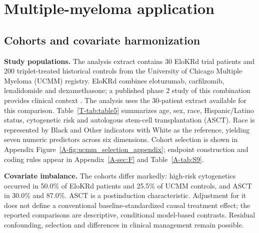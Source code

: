 \documentclass[11pt]{article}
\theoremstyle{remark}\newtheorem{remark}{Remark}[section]
\providecommand{\DIFdeltex}[1]{{\protect\color{red} \scriptsize #1}} %
\providecommand{\DIFdelbegin}{} %
\providecommand{\DIFdelend}{} %
\providecommand{\DIFdel}[1]{\texorpdfstring{\DIFdeltex{#1}}{}} %
\begin{document}
\DIFdelbegin \section{\DIFdel{Multiple-myeloma application}}
\addtocounter{section}{-1}%
\DIFdelend \subsection{Cohorts and covariate harmonization}
\DIFdelbegin %
\DIFdel{\textbf{Study populations.}
}\DIFdelend The analysis extract contains 30 EloKRd trial patients and 200 triplet-treated historical controls from the University of Chicago Multiple Myeloma (UCMM) registry. EloKRd combines elotuzumab, carfilzomib, lenalidomide and dexamethasone; a published phase 2 study of this combination provides clinical context \citep{Derman2022}. The analysis uses the 30-patient extract available for this comparison. Table~\ref{T-tab:table5} summarizes age, sex, race, Hispanic/Latino status, cytogenetic risk and autologous stem-cell transplantation (ASCT). Race is represented by Black and Other indicators with White as the reference, yielding seven numeric predictors across six dimensions. Cohort selection is shown in Appendix Figure~\ref{A-fig:ucmm_selection_appendix}; endpoint construction and coding rules appear in Appendix~\ref{A-sec:F} and Table~\ref{A-tab:S9}.

\DIFdelbegin %
\DIFdel{\textbf{Covariate imbalance.}
}\DIFdelend The cohorts differ markedly: high-risk cytogenetics occurred in 50.0\% of EloKRd patients and 25.5\% of UCMM controls, and ASCT in 30.0\% and 87.0\%. ASCT is a postinduction characteristic. Adjustment for it does not define a conventional baseline-standardized causal treatment effect; the reported comparisons are descriptive, conditional model-based contrasts. Residual confounding, selection and differences in clinical management remain possible.
\end{document}
